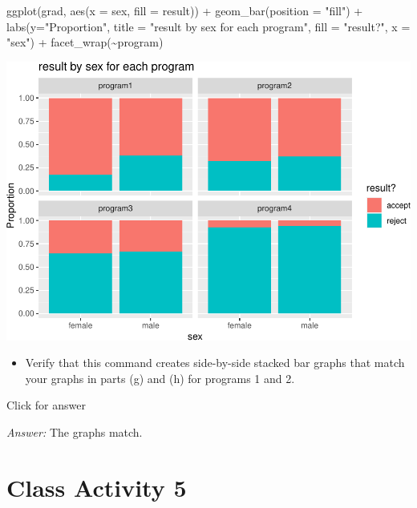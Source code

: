 \documentclass[
]{book}
\newenvironment{Shaded}{\begin{snugshade}}{\end{snugshade}}
\newcommand{\AttributeTok}[1]{\textcolor[rgb]{0.77,0.63,0.00}{#1}}
\newcommand{\FunctionTok}[1]{\textcolor[rgb]{0.00,0.00,0.00}{#1}}
\newcommand{\NormalTok}[1]{#1}
\newcommand{\SpecialCharTok}[1]{\textcolor[rgb]{0.00,0.00,0.00}{#1}}
\newcommand{\StringTok}[1]{\textcolor[rgb]{0.31,0.60,0.02}{#1}}
\providecommand{\tightlist}{%
  \setlength{\itemsep}{0pt}\setlength{\parskip}{0pt}}
\begin{document}
\begin{Shaded}
\begin{Highlighting}[]
\FunctionTok{ggplot}\NormalTok{(grad, }\FunctionTok{aes}\NormalTok{(}\AttributeTok{x =}\NormalTok{ sex, }\AttributeTok{fill =}\NormalTok{ result)) }\SpecialCharTok{+} 
  \FunctionTok{geom\_bar}\NormalTok{(}\AttributeTok{position =} \StringTok{"fill"}\NormalTok{) }\SpecialCharTok{+} 
  \FunctionTok{labs}\NormalTok{(}\AttributeTok{y=}\StringTok{"Proportion"}\NormalTok{, }
       \AttributeTok{title =} \StringTok{"result by sex for each program"}\NormalTok{, }
       \AttributeTok{fill =} \StringTok{"result?"}\NormalTok{, }
       \AttributeTok{x =} \StringTok{"sex"}\NormalTok{) }\SpecialCharTok{+} 
  \FunctionTok{facet\_wrap}\NormalTok{(}\SpecialCharTok{\textasciitilde{}}\NormalTok{program)}
\end{Highlighting}
\end{Shaded}

\includegraphics[width=1\linewidth]{Class_Activity_4_files/figure-latex/unnamed-chunk-38-1}

\begin{itemize}
\tightlist
\item
  Verify that this command creates side-by-side stacked bar graphs that match your graphs in parts (g) and (h) for programs 1 and 2.
\end{itemize}

Click for answer

\emph{Answer:} The graphs match.

\hypertarget{class-activity-5}{%
\chapter{Class Activity 5}\label{class-activity-5}}
\end{document}
